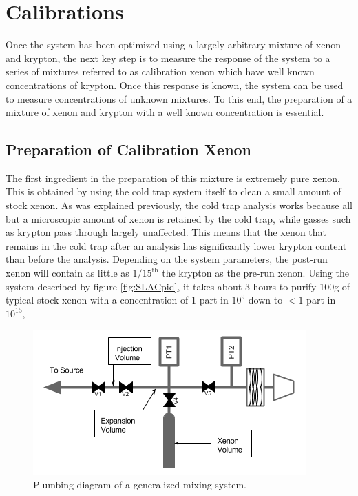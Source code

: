 \documentclass[12pt]{article}
\begin{document}
\section{Calibrations}
Once the system has been optimized using a largely arbitrary mixture of xenon and krypton, the next key step is to measure the response of the system to a series of mixtures referred to as calibration xenon which have well known concentrations of krypton. Once this response is known, the system can be used to measure concentrations of unknown mixtures. To this end, the preparation of a mixture of xenon and krypton with a well known concentration is essential.

\subsection{Preparation of Calibration Xenon}
The first ingredient in the preparation of this mixture is extremely pure xenon. This is obtained by using the cold trap system itself to clean a small amount of stock xenon. As was explained previously, the cold trap analysis works because all but a microscopic amount of xenon is retained by the cold trap, while gasses such as krypton pass through largely unaffected. This means that the xenon that remains in the cold trap after an analysis has significantly lower krypton content than before the analysis. Depending on the system parameters, the post-run xenon will contain as little as $1/15^{\textrm{th}}$ the krypton as the pre-run xenon. Using the system described by figure \ref{fig:SLACpid}, it takes about 3 hours to purify 100g of typical stock xenon with a concentration of 1 part in $10^{9}$ down to $< 1$ part in $10^{15}$, 


\begin{figure}[h]
  \includegraphics[width=\linewidth]{Figures/Mixing_diagram.png}
  \caption{Plumbing diagram of a generalized mixing system. }
  \label{fig:mixpid}
\end{figure}
\end{document}
